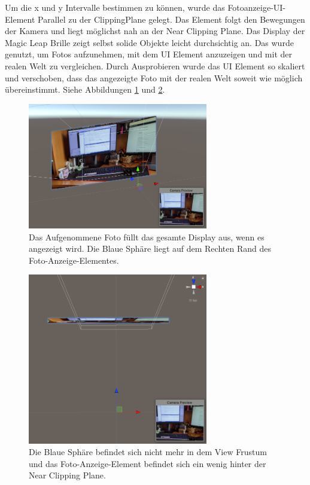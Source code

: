 Um die x und y Intervalle bestimmen zu können, wurde das Fotoanzeige-UI-Element Parallel zu der ClippingPlane gelegt. Das Element folgt den Bewegungen der Kamera und liegt möglichst nah an der Near Clipping Plane. Das Display der Magic Leap Brille zeigt selbst solide Objekte leicht durchsichtig an. Das wurde genutzt, um Fotos aufzunehmen, mit dem UI Element anzuzeigen und mit der realen Welt zu vergleichen. Durch Ausprobieren wurde das UI Element so skaliert und verschoben, dass das angezeigte Foto mit der realen Welt soweit wie möglich übereinstimmt. Siehe Abbildungen \ref{illustration:canvasinsourface} und \ref{illustration:canvasinsourfacetodown}.

\begin{figure}[H]
	\centering
	\includegraphics[width=0.7\textwidth]{images/canvasinyourface.PNG}
	\caption[]{Das Aufgenommene Foto füllt das gesamte Display aus, wenn es angezeigt wird. Die Blaue Sphäre liegt auf dem Rechten Rand des Foto-Anzeige-Elementes.}
	\label{illustration:canvasinsourface}
\end{figure}

\begin{figure}[H]
	\centering
	\includegraphics[width=0.7\textwidth]{images/canvasinyourfaceTopDown.PNG}
	\caption[]{Die Blaue Sphäre befindet sich nicht mehr in dem View Frustum und das Foto-Anzeige-Element befindet sich ein wenig hinter der Near Clipping Plane.}
	\label{illustration:canvasinsourfacetodown}
\end{figure}

